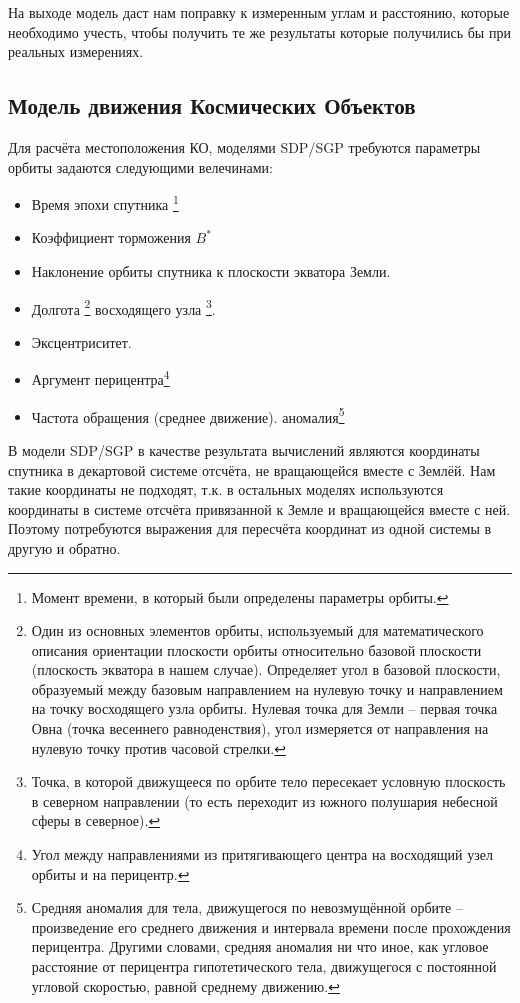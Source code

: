 На выходе модель даст нам поправку к измеренным углам и расстоянию, которые необходимо учесть, чтобы получить те же
результаты которые получились бы при реальных измерениях.

\subsection{Модель движения Космических Объектов} \label{sbs:space-object-model}

Для расчёта местоположения КО, моделями SDP/SGP требуются параметры орбиты задаются следующими велечинами:
\begin{itemize}
	\item Время эпохи спутника \footnote{Момент времени, в который были определены параметры орбиты.}
	\item Коэффициент торможения $B^*$
	\item Наклонение орбиты спутника к плоскости экватора Земли.
	\item Долгота
		\footnote{
			Один из основных элементов орбиты, используемый для 
			математического описания ориентации плоскости орбиты относительно базовой плоскости (плоскость экватора 
			в нашем случае). Определяет угол в базовой плоскости, образуемый между базовым направлением на
			нулевую точку и направлением на точку восходящего узла орбиты. Нулевая точка для 
			Земли -- первая точка Овна (точка весеннего равноденствия), угол измеряется от направления на нулевую 
			точку против часовой стрелки.
		} восходящего узла
			\footnote{
				Точка, в которой движущееся по орбите
				тело пересекает условную плоскость в северном направлении (то есть переходит из южного полушария
				небесной сферы в северное).
		}.
	\item Эксцентриситет.
	\item Аргумент перицентра\footnote{Угол между направлениями из притягивающего центра на восходящий 
			узел орбиты и на перицентр.}
	\item Частота обращения (среднее движение).
	 аномалия\footnote{Средняя аномалия для тела, движущегося по невозмущённой орбите -- произведение
			его среднего движения и интервала времени после прохождения перицентра. Другими словами, средняя
			аномалия ни что иное, как угловое расстояние от перицентра гипотетического тела, движущегося с
			постоянной угловой скоростью, равной среднему движению.}
\end{itemize}

В модели SDP/SGP в качестве результата вычислений являются координаты спутника в декартовой системе отсчёта, не
вращающейся вместе с Землёй. Нам такие координаты не подходят, т.к. в остальных моделях используются координаты в
системе отсчёта привязанной к Земле и вращающейся вместе с ней. Поэтому потребуются выражения для пересчёта
координат из одной системы в другую и обратно.

